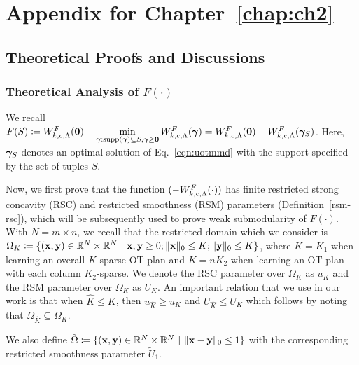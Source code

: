 \renewcommand{\thechapter}{B}
\chapter{Appendix for Chapter~\ref{chap:ch2}}\label{APP:B}

\renewcommand{\thesection}{B.\arabic{section}}
\renewcommand{\thesubsection}{B.\arabic{section}.\arabic{subsection}}
\renewcommand{\thefigure}{B.\arabic{figure}}
\renewcommand{\thetable}{B.\arabic{table}}
\renewcommand{\theequation}{B.\arabic{equation}}

\section{Theoretical Proofs and Discussions}
\subsection[Theoretical Analysis of our Set Function]{Theoretical Analysis of $F(\cdot)$} 
We recall $F(S) \coloneqq W^F_{k, c, \Lambda}(\mathbf{0})-\min\limits_{\bm{\gamma}:\textup{supp}(\bm{\gamma})\subseteq S,\bm{\gamma}\geq \mathbf{0}} W^F_{k, c, \Lambda}({\bm{\gamma}})=W^F_{k, c, \Lambda}(\mathbf{0}) - W^F_{k, c, \Lambda}(\bm{\gamma}_S)$. Here, $\bm{\gamma}_S$ denotes an optimal solution of Eq.~\ref{eqn:uotmmd} with the support specified by the set of tuples $S$.

Now, we first prove that the function $(-W^F_{k, c, \Lambda}(\cdot))$ has finite restricted strong concavity (RSC) and restricted smoothness (RSM) parameters (Definition~\ref{rsm-rsc}), which will be subsequently used to prove weak submodularity of $F(\cdot)$. With $N=m\times n$, we recall that the restricted domain which we consider is $\Omega_K \coloneqq \{ (\mathbf{x}, \mathbf{y})\in \mathbb{R}^N\times \mathbb{R}^N~|~ \mathbf{x}, \mathbf{y} \geq 0; \|\mathbf{x}\|_0 \leq K; \|\mathbf{y}\|_0 \leq K\}$, where $K=K_1$ when learning an overall $K$-sparse OT plan and $K=nK_2$ when learning an OT plan with each column $K_2$-sparse. We denote the RSC parameter over $\Omega_K$ as $u_{K}$ and the RSM parameter over $\Omega_K$ as $U_{K}$. An important relation that we use in our work is that when $\hat{K} \leq K$, then $u_{\hat{K}} \geq u_K$ and $U_{\hat{K}} \leq U_K$ which follows by noting that $\Omega_{\hat{K}} \subseteq \Omega_{K}$. 

We also define $\tilde{\Omega}\coloneqq  \{(\mathbf{x},\mathbf{y})\in \mathbb{R}^N\times \mathbb{R}^N~|~ \|\mathbf{x}-\mathbf{y}\|_0 \leq 1\}$  with the corresponding restricted smoothness parameter $\tilde{U}_1$.

